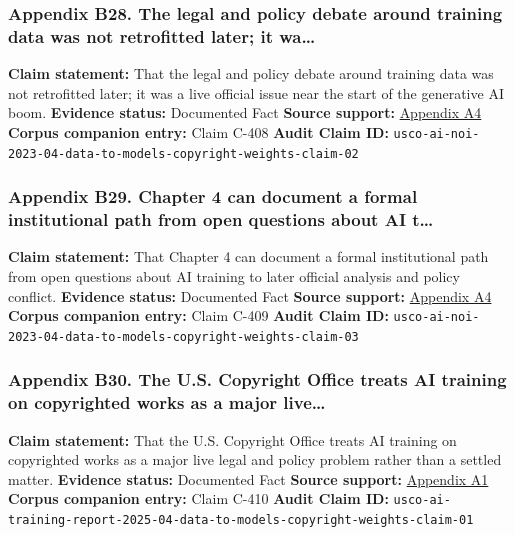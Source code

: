 \documentclass[
  american,
  11pt,
  letterpaper,
]{article}
\begin{document}
\subsubsection{Appendix B28. The legal and policy debate around training
data was not retrofitted later; it
wa\ldots{}}\label{appendix-b28-the-legal-and-policy-debate-around-training-data-was-not-retrofitted-later-it-wa}

\textbf{Claim statement:} That the legal and policy debate around
training data was not retrofitted later; it was a live official issue
near the start of the generative AI boom. \textbf{Evidence status:}
Documented Fact \textbf{Source support:}
\hyperref[appendix-a4-copyright-and-artificial-intelligence-notice-of-inquiry]{Appendix
A4} \textbf{Corpus companion entry:} Claim C-408 \textbf{Audit Claim
ID:}
\texttt{usco-ai-noi-2023-04-data-to-models-copyright-weights-claim-02}

\subsubsection{Appendix B29. Chapter 4 can document a formal
institutional path from open questions about AI
t\ldots{}}\label{appendix-b29-chapter-4-can-document-a-formal-institutional-path-from-open-questions-about-ai-t}

\textbf{Claim statement:} That Chapter 4 can document a formal
institutional path from open questions about AI training to later
official analysis and policy conflict. \textbf{Evidence status:}
Documented Fact \textbf{Source support:}
\hyperref[appendix-a4-copyright-and-artificial-intelligence-notice-of-inquiry]{Appendix
A4} \textbf{Corpus companion entry:} Claim C-409 \textbf{Audit Claim
ID:}
\texttt{usco-ai-noi-2023-04-data-to-models-copyright-weights-claim-03}

\subsubsection{Appendix B30. The U.S. Copyright Office treats AI
training on copyrighted works as a major
live\ldots{}}\label{appendix-b30-the-u-s-copyright-office-treats-ai-training-on-copyrighted-works-as-a-major-live}

\textbf{Claim statement:} That the U.S. Copyright Office treats AI
training on copyrighted works as a major live legal and policy problem
rather than a settled matter. \textbf{Evidence status:} Documented Fact
\textbf{Source support:}
\hyperref[appendix-a1-copyright-and-artificial-intelligence-part-3-generative-ai-training-pre-publication-version]{Appendix
A1} \textbf{Corpus companion entry:} Claim C-410 \textbf{Audit Claim
ID:}
\texttt{usco-ai-training-report-2025-04-data-to-models-copyright-weights-claim-01}
\end{document}
